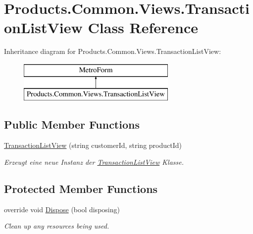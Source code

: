 \hypertarget{class_products_1_1_common_1_1_views_1_1_transaction_list_view}{}\section{Products.\+Common.\+Views.\+Transaction\+List\+View Class Reference}
\label{class_products_1_1_common_1_1_views_1_1_transaction_list_view}
Inheritance diagram for Products.\+Common.\+Views.\+Transaction\+List\+View\+:\begin{figure}[H]
\begin{center}
\leavevmode
\includegraphics[height=2.000000cm]{class_products_1_1_common_1_1_views_1_1_transaction_list_view}
\end{center}
\end{figure}
\subsection*{Public Member Functions}
\begin{DoxyCompactItemize}
\item 
\hyperlink{class_products_1_1_common_1_1_views_1_1_transaction_list_view_a3bb14d794fd5ab56d64e8837c714ffae}{Transaction\+List\+View} (string customer\+Id, string product\+Id)
\begin{DoxyCompactList}\small\item\em Erzeugt eine neue Instanz der \hyperlink{class_products_1_1_common_1_1_views_1_1_transaction_list_view}{Transaction\+List\+View} Klasse. \end{DoxyCompactList}\end{DoxyCompactItemize}
\subsection*{Protected Member Functions}
\begin{DoxyCompactItemize}
\item 
override void \hyperlink{class_products_1_1_common_1_1_views_1_1_transaction_list_view_aea0c79fd39eba86427e2526117e15b58}{Dispose} (bool disposing)
\begin{DoxyCompactList}\small\item\em Clean up any resources being used. \end{DoxyCompactList}\end{DoxyCompactItemize}


